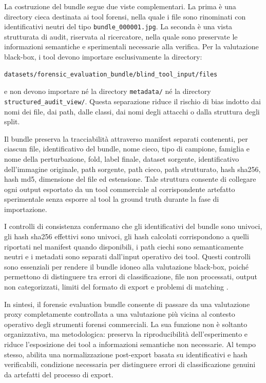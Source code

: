 La costruzione del bundle segue due viste complementari. La prima è una
directory cieca destinata ai tool forensi, nella quale i file sono rinominati con
identificativi neutri del tipo \texttt{bundle\_000001.jpg}. La seconda è una
vista strutturata di audit, riservata al ricercatore, nella quale sono preservate
le informazioni semantiche e sperimentali necessarie alla verifica. Per la
valutazione black-box, i tool devono importare esclusivamente la directory:

\begin{verbatim}
datasets/forensic_evaluation_bundle/blind_tool_input/files
\end{verbatim}

e non devono importare né la directory \texttt{metadata/} né la directory
\texttt{structured\_audit\_view/}. Questa separazione riduce il rischio di bias
indotto dai nomi dei file, dai path, dalle classi, dai nomi degli attacchi o
dalla struttura degli split.

Il bundle preserva la tracciabilità attraverso manifest separati contenenti, per
ciascun file, identificativo del bundle, nome cieco, tipo di campione, famiglia e
nome della perturbazione, fold, label finale, dataset sorgente, identificativo
dell'immagine originale, path sorgente, path cieco, path strutturato, hash
\gls{sha256}, hash \gls{md5}, dimensione del file ed estensione. Tale struttura
consente di collegare ogni output esportato da un tool commerciale al
corrispondente artefatto sperimentale senza esporre al tool la ground truth
durante la fase di importazione.

I controlli di consistenza confermano che gli identificativi del bundle sono
univoci, gli hash \gls{sha256} effettivi sono univoci, gli hash calcolati
corrispondono a quelli riportati nel manifest quando disponibili, i path ciechi
sono semanticamente neutri e i metadati sono separati dall'input operativo dei
tool. Questi controlli sono essenziali per rendere il bundle idoneo alla
valutazione black-box, poiché permettono di distinguere tra errori di
classificazione, file non processati, output non categorizzati, limiti del
formato di export e problemi di matching \cite{iso27041,iso27042,iso27043,swgde2014validation}.

In sintesi, il forensic evaluation bundle consente di passare da una valutazione
proxy completamente controllata a una valutazione più vicina al contesto
operativo degli strumenti forensi commerciali. La sua funzione non è soltanto
organizzativa, ma metodologica: preserva la riproducibilità dell'esperimento e
riduce l'esposizione dei tool a informazioni semantiche non necessarie. Al tempo
stesso, abilita una normalizzazione post-export basata su identificativi e hash
verificabili, condizione necessaria per distinguere errori di classificazione
genuini da artefatti del processo di export.

